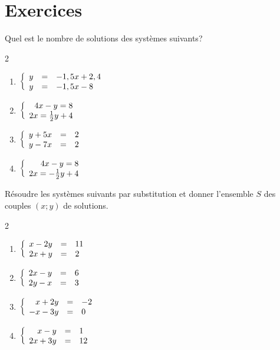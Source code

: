 \documentclass[10pt,a4paper,openany,twoside, eleve]{book}
\begin{document}
\vspace{-5mm}
\setcounter{section}{1}
\section*{Exercices}
\vspace{-3mm}
\begin{exercicesnofoot}
	\begin{exo}
      Quel est le nombre de solutions des systèmes suivants?

      \begin{multicols}{2}
         \begin{enumerate}
            \item $\left\{\begin{array}{rcl} y &=& - 1,5 x + 2,4 \\ y &=& - 1,5 x - 8 \end{array}\right.$
            \item $\left\{\begin{array}{rcl} 4x -y = 8 \\ 2x = \frac{1}{2}y +4 \end{array}\right.$
            \item $\left\{\begin{array}{rcl} y +5x &=& 2 \\ y -7x &=& 2 \end{array}\right.$
            \item $\left\{\begin{array}{rcl} 4x -y = 8 \\ 2x = -\frac{1}{2}y +4 \end{array}\right.$
         \end{enumerate}
      \end{multicols}
   \end{exo}
\vspace{-3mm}
   \begin{exo}
      Résoudre les systèmes suivants par substitution et donner l'ensemble $S$ des couples $(x;y)$ de solutions.
      \begin{multicols}{2}
         \begin{enumerate}
            \item $\left\{\begin{array}{rcl} x	-	2y	&=&	11 \\
2x	+	y	&=&	2 \end{array}\right.$
            \item $\left\{\begin{array}{rcl} 
               2x	-	y	&=&	6 \\
2y -x	&=&	3
             \end{array}\right.$
            \item $\left\{\begin{array}{rcl} 
               x	+	2y	&=&	-2 \\
-x	-	3y	&=&	0
             \end{array}\right.$
            \item $\left\{\begin{array}{rcl} 
               x-y&=&1 \\
               2x+3y&=&12
             \end{array}\right.$
         \end{enumerate}
      \end{multicols}


\end{exo}
\end{exercicesnofoot}
\end{document}
